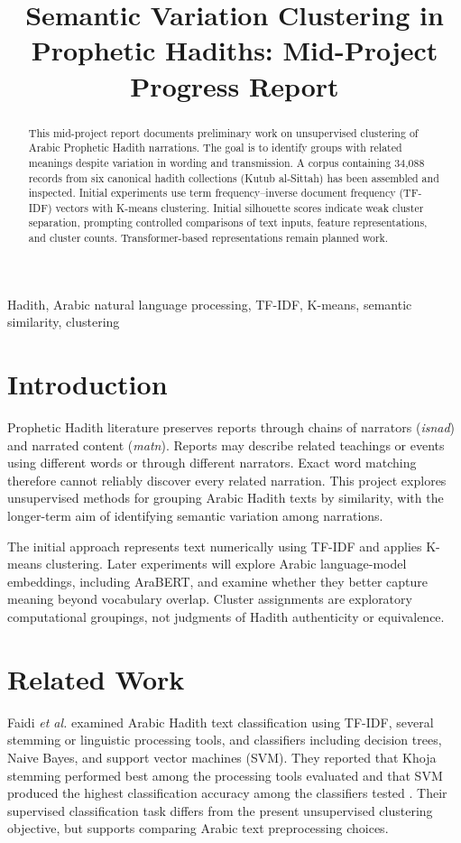 \documentclass[conference]{IEEEtran}
\begin{document}
\title{Semantic Variation Clustering in Prophetic Hadiths: Mid-Project Progress Report}
\author{}
\maketitle
\begin{abstract}
This mid-project report documents preliminary work on unsupervised clustering of Arabic Prophetic Hadith narrations. The goal is to identify groups with related meanings despite variation in wording and transmission. A corpus containing 34,088 records from six canonical hadith collections (Kutub al-Sittah) has been assembled and inspected. Initial experiments use term frequency--inverse document frequency (TF-IDF) vectors with K-means clustering. Initial silhouette scores indicate weak cluster separation, prompting controlled comparisons of text inputs, feature representations, and cluster counts. Transformer-based representations remain planned work.
\end{abstract}
\begin{IEEEkeywords}
Hadith, Arabic natural language processing, TF-IDF, K-means, semantic similarity, clustering
\end{IEEEkeywords}
\section{Introduction}
Prophetic Hadith literature preserves reports through chains of narrators (\emph{isnad}) and narrated content (\emph{matn}). Reports may describe related teachings or events using different words or through different narrators. Exact word matching therefore cannot reliably discover every related narration. This project explores unsupervised methods for grouping Arabic Hadith texts by similarity, with the longer-term aim of identifying semantic variation among narrations.

The initial approach represents text numerically using TF-IDF and applies K-means clustering. Later experiments will explore Arabic language-model embeddings, including AraBERT, and examine whether they better capture meaning beyond vocabulary overlap. Cluster assignments are exploratory computational groupings, not judgments of Hadith authenticity or equivalence.

\section{Related Work}
Faidi \emph{et al.} examined Arabic Hadith text classification using TF-IDF, several stemming or linguistic processing tools, and classifiers including decision trees, Naive Bayes, and support vector machines (SVM). They reported that Khoja stemming performed best among the processing tools evaluated and that SVM produced the highest classification accuracy among the classifiers tested \cite{faidi}. Their supervised classification task differs from the present unsupervised clustering objective, but supports comparing Arabic text preprocessing choices.
\end{document}
